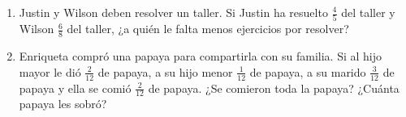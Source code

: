 \documentclass[letterpaper,fleqn]{article}
\begin{document}
\begin{enumerate}
\begin{enumerate}
\end{enumerate}
\item Justin y Wilson deben resolver un taller. Si Justin ha resuelto $\frac{4}{5}$ del taller y Wilson $\frac{6}{8}$ del taller, ¿a quién le falta menos ejercicios por resolver?\noanswer
\item Enriqueta compró una papaya para compartirla con su familia. Si al hijo mayor le dió $\frac{2}{12} $ de papaya, a su hijo menor $\frac{1}{12}$ de papaya, a su marido $\frac{3}{12}$ de papaya y ella se comió $\frac{2}{12}$ de papaya. ¿Se comieron toda la papaya? ¿Cuánta papaya les sobró?\noanswer
 \end{enumerate}
\end{document}
